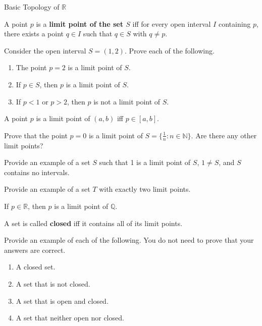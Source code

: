 \begin{section}{Basic Topology of $\mathbb{R}$}
\begin{definition}
A point $p$ is a \textbf{limit point of the set $S$} iff for every open interval $I$ containing $p$, there exists a point $q \in I$ such that $q \in S$ with $q\neq p$.
\end{definition}

\begin{problem}
Consider the open interval $S=(1,2)$. Prove each of the following.
\begin{enumerate}
\item The point $p=2$ is a limit point of $S$.
\item If $p\in S$, then $p$ is a limit point of $S$.
\item If $p<1$ or $p>2$, then $p$ is not a limit point of $S$.
\end{enumerate}
\end{problem}

\begin{theorem}[*]
A point $p$ is a limit point of $(a,b)$ iff $p\in [a,b]$.
\end{theorem}

\begin{problem}
Prove that the point $p=0$ is a limit point of $S=\{\frac{1}{n}: n \in \mathbb{N}\}$.  Are there any other limit points?
\end{problem}

\begin{exercise}
Provide an example of a set $S$ such that 1 is a limit point of $S$, $1\neq S$, and $S$ contains no intervals.
\end{exercise}

\begin{exercise}
Provide an example of a set $T$ with exactly two limit points.
\end{exercise}

\begin{theorem}
If $p\in\mathbb{R}$, then $p$ is a limit point of $\mathbb{Q}$.
\end{theorem}

\begin{definition}
A set is called \textbf{closed} iff it contains all of its limit points.
\end{definition}

\begin{exercise}
Provide an example of each of the following.  You do not need to prove that your answers are correct.
\begin{enumerate}
\item A closed set.
\item A set that is not closed.
\item A set that is open and closed.
\item A set that neither open nor closed.
\end{enumerate}


\end{exercise}
\end{section}
